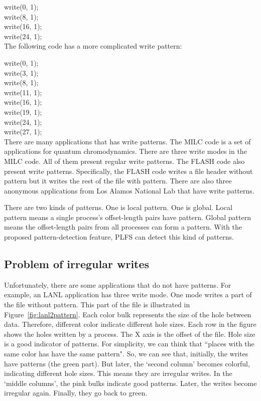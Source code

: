 \documentclass{acm_proc_article-sp}
\begin{document}
write(0, 1);\\
write(8, 1);\\
write(16, 1);\\
write(24, 1);\\

The following code has a more complicated write
pattern:

write(0, 1);\\
write(3, 1);\\
write(8, 1);\\
write(11, 1);\\
write(16, 1);\\
write(19, 1);\\
write(24, 1);\\
write(27, 1);\\

There are many applications that has write patterns.
The MILC code is a set of applications
for quantum chromodynamics. There are three write
modes in the MILC code. All of them present
regular write patterns. The FLASH code also
present write patterns. Specifically, the FLASH
code writes a file header without pattern but it
writes the rest of the file with pattern. 
There are also three anonymous applications
from Los Alamos National Lab that have write
patterns. 


There are two kinds of patterns. One is local pattern.
One is global. Local pattern means a single process's
offset-length pairs have pattern. Global
pattern means the offset-length pairs from all processes
can form a pattern. With the proposed pattern-detection
feature, PLFS can detect this kind of patterns.

\subsection{Problem of irregular writes}
Unfortunately, there are some applications that do
not have patterns. For example, an LANL application 
has three write mode. One mode writes a part of
the file without pattern. This part of the file
is illustrated in Figure~\ref{fig:lanl2pattern}.
Each color bulk represents the size of the hole
between data. Therefore, different color indicate
different hole sizes. 
Each row in the figure
shows the holes written by a process. 
The X axis is the offset of the file.
Hole size is a good 
indicator of patterns. For simplicity, 
we can think that ``places with the same color
has have the same pattern". So, we can see
that, initially, the writes have patterns (the green
part). But later, the `second column' becomes
colorful, indicating different hole sizes. This 
means they are irregular writes. In the `middle
columns', the pink bulks indicate good patterns.
Later, the writes become irregular again.
Finally, they go back to green. 
\end{document}
